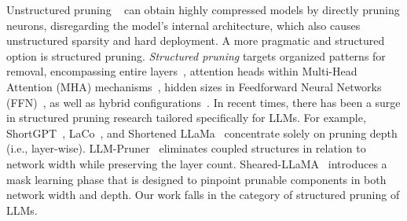Unstructured pruning ~\cite{dong2017learning,lee2018snip,wang2020picking,sun2023simple,frantar2023sparsegpt} can obtain highly compressed models by directly pruning neurons, disregarding the model's internal architecture, which also causes unstructured sparsity and hard deployment.
A more pragmatic and structured option is structured pruning. \textit{Structured pruning} targets organized patterns for removal, encompassing entire layers~\cite{jha2023train}, attention heads within Multi-Head Attention (MHA) mechanisms~\cite{michel2019sixteen}, hidden sizes in Feedforward Neural Networks (FFN)~\cite{nova2023gradient}, as well as hybrid configurations~\cite{kurtic2024ziplm}. 
In recent times, there has been a surge in structured pruning research tailored specifically for LLMs. For example, ShortGPT~\cite{men2024shortgpt}, LaCo~\cite{yang2024laco}, and Shortened LLaMa~\cite{kim2024shortened} concentrate solely on pruning depth (i.e., layer-wise). LLM-Pruner~\cite{ma2023llm} eliminates coupled structures in relation to network width while preserving the layer count. Sheared-LLaMA~\cite{xia2023sheared} introduces a mask learning phase that is designed to pinpoint prunable components in both network width and depth.
Our work falls in the category of structured pruning of LLMs.